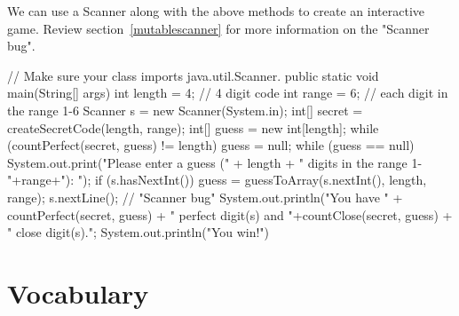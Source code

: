 We can use a Scanner along with the above methods to create an interactive game. Review section~\ref{mutablescanner} for more information on the "Scanner bug".

\begin{code}
// Make sure your class imports java.util.Scanner.
public static void main(String[] args) {
	int length = 4; // 4 digit code
	int range = 6; // each digit in the range 1-6
	Scanner s = new Scanner(System.in);
	int[] secret = createSecretCode(length, range);
	int[] guess = new int[length];
	while (countPerfect(secret, guess) != length) {
		guess = null;
		while (guess == null) {
			System.out.print("Please enter a guess (" + length
				+ " digits in the range 1-"+range+"): ");
			if (s.hasNextInt()) {
				guess = guessToArray(s.nextInt(), length, range);
			}
			s.nextLine(); // "Scanner bug"
		}
		System.out.println("You have " + countPerfect(secret, guess)
			+ " perfect digit(s) and "+countClose(secret, guess)
			+ " close digit(s).";
	}
	System.out.println("You win!")
}
\end{code}


\section{Vocabulary}

